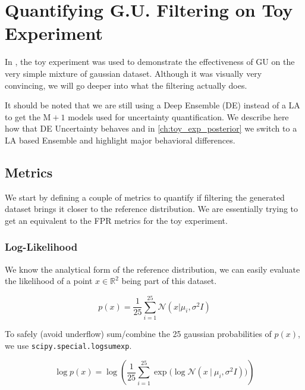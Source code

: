 
\chapter{Quantifying G.U. Filtering on Toy Experiment}
\label{ch:quantifying_gu_filtering_toy}

In \cite{jazbec_generative_2025}, the toy experiment was used to demonstrate the effectiveness of \acs{GU} on the very simple mixture of gaussian dataset. Although it was visually very convincing, we will go deeper into what the filtering actually does.

\begin{tcolorbox}[colback=orange!10!white,colframe=orange!50!black,sharp corners]
It should be noted that we are still using a Deep Ensemble (\acs{DE}) instead of a \acs{LA} to get the $\text{M}+1$ models used for uncertainty quantification. We describe here how that \acs{DE} Uncertainty behaves and in \autoref{ch:toy_exp_posterior} we switch to a \acs{LA} based Ensemble and highlight major behavioral differences.
\end{tcolorbox}

\section{Metrics}
\label{sub:toy_metrics}

We start by defining a couple of metrics to quantify if filtering the generated dataset brings it closer to the reference distribution. We are essentially trying to get an equivalent to the \acs{FPR} metrics for the toy experiment.

\subsection{Log-Likelihood}

We know the analytical form of the reference distribution, we can easily evaluate the likelihood of a point $x \in \mathbb{R}^2$ being part of this dataset.

\begin{equation}
\label{eq:log-lik-toy}
p(x) = \frac{1}{25} \sum_{i=1}^{25} \mathcal{N}(x | \mu_i,\sigma^2 I)
\end{equation}


To safely (avoid underflow) sum/combine the 25 gaussian probabilities of $p(x)$, we use \texttt{scipy.special.logsumexp}.

\begin{equation}
\log p(x) = \log \left( \frac{1}{25} \sum_{i=1}^{25} \exp \Big( \log \mathcal{N}(x \ | \ \mu_i, \sigma^2 I) \Big) \right)
\end{equation}


